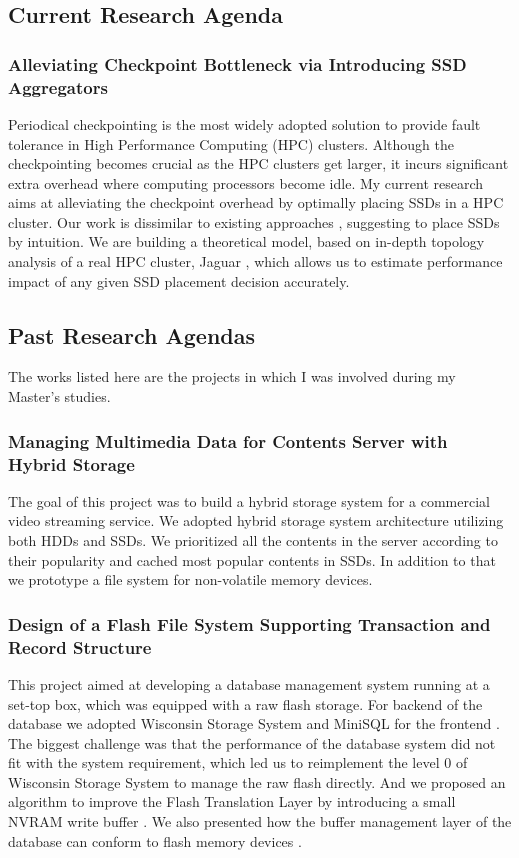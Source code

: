 \documentclass[letterpaper, 10pt]{article}
\begin{document}
\subsection*{Current Research Agenda}

\subsubsection*{Alleviating Checkpoint Bottleneck via Introducing SSD
Aggregators}

Periodical checkpointing is the most widely adopted solution to provide
fault tolerance in High Performance Computing (HPC) clusters. Although the
checkpointing becomes crucial as the HPC clusters get larger, it
incurs significant extra overhead where computing processors become idle.
My current research aims at alleviating the checkpoint overhead by optimally
placing SSDs in a HPC cluster. Our work is dissimilar to existing approaches
\cite{bg}\cite{burst},
suggesting to place SSDs by intuition.
We are building a theoretical model,
based on in-depth topology analysis of a real HPC cluster, Jaguar \cite{jaguar},
which allows us to estimate performance impact of any given SSD placement decision
accurately.

\subsection*{Past Research Agendas}

The works listed here are the projects in which I was involved during my
Master's studies.

\subsubsection*{Managing Multimedia Data for Contents Server with Hybrid
Storage}
The goal of this project was to build a hybrid storage system for a commercial
video streaming service. We adopted hybrid storage system architecture utilizing
both HDDs and SSDs. We prioritized all the contents in the server
according to their popularity and cached most popular contents in SSDs.
In addition to that we prototype a file system for non-volatile memory devices.

\subsubsection*{Design of a Flash File System Supporting
Transaction and Record Structure}
This project aimed at developing a database management system running at a
set-top box, which was equipped with a raw flash storage. For backend of the
database we adopted Wisconsin Storage System \cite{wiss} and MiniSQL for the
frontend \cite{minisql}. The biggest challenge was that the performance of the
database system did not fit with the system requirement, which led us to
reimplement the level 0 of Wisconsin Storage System to manage the raw flash
directly. And we proposed an algorithm to improve the Flash Translation Layer
by introducing a small NVRAM write buffer 
\cite{tc}.
We also presented how the buffer
management layer of the database can conform to flash memory devices
\cite{tce}.
\end{document}
